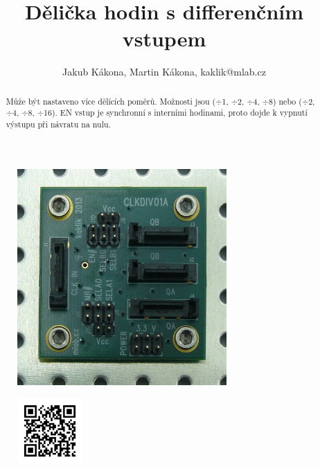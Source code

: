 \documentclass[12pt,a4paper,oneside]{article}
\begin{document}
\title{Dělička hodin s differenčním vstupem }
\author{Jakub Kákona, Martin Kákona, kaklik@mlab.cz}
\maketitle

\thispagestyle{empty}
\begin{abstract}
Může být nastaveno více dělících poměrů. Možnosti jsou ($\div$1, $\div$2, $\div$4, $\div$8) nebo ($\div$2, $\div$4, $\div$8, $\div$16). EN vstup je synchronní s interními hodinami, proto dojde k vypnutí výstupu při návratu na nulu.
\end{abstract}

\begin{figure} [htbp]
\begin{center}
\includegraphics [width=80mm] {./img/CLKDIV01A_Top_Big.jpg} 
\end{center}
\end{figure}

\begin{figure} [b]
\includegraphics [width=25mm] {./img/CLKDIV01A_QRcode.png} 
\end{figure}

\newpage
\tableofcontents
\end{document}
